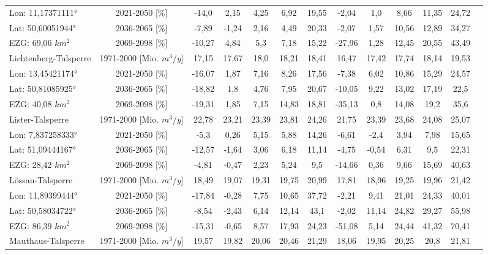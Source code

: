 \begin{longtable}{@{\extracolsep{\fill}}lc|ccccc||cccccc}
\cline{2-13} 
Lon: 11,17371111° & 2021-2050 [\%]  & -14,0 & 2,15 & 4,25 & 6,92 & 19,55 & -2,04 & 1,0 & 8,66 & 11,35 & 24,72 & \\ 
Lat: 50,60051944° & 2036-2065 [\%]  & -7,89 & -1,24 & 2,16 & 4,49 & 20,33 & -2,07 & 1,57 & 10,56 & 12,89 & 34,27 & \\ 
EZG: 69,06 $km^2$ & 2069-2098 [\%]  & -10,27 & 4,84 & 5,3 & 7,18 & 15,22 & -27,96 & 1,28 & 12,45 & 20,55 & 43,49 & \\ 
\hline 
Lichtenberg-Talsperre & 1971-2000 [Mio. $m^3/y$]  & 17,15 & 17,67 & 18,0 & 18,21 & 18,41 & 16,47 & 17,42 & 17,74 & 18,14 & 19,53 & \\ 
\cline{2-13} 
Lon: 13,45421174° & 2021-2050 [\%]  & -16,07 & 1,87 & 7,16 & 8,26 & 17,56 & -7,38 & 6,02 & 10,86 & 15,29 & 24,57 & \\ 
Lat: 50,81085925° & 2036-2065 [\%]  & -18,82 & 1,8 & 4,76 & 7,95 & 20,67 & -10,05 & 9,22 & 13,02 & 17,19 & 22,5 & \\ 
EZG: 40,08 $km^2$ & 2069-2098 [\%]  & -19,31 & 1,85 & 7,15 & 14,83 & 18,81 & -35,13 & 0,8 & 14,08 & 19,2 & 35,6 & \\ 
\hline 
Lister-Talsperre & 1971-2000 [Mio. $m^3/y$]  & 22,78 & 23,21 & 23,39 & 23,81 & 24,26 & 21,75 & 23,39 & 23,68 & 24,08 & 25,07 & \\ 
\cline{2-13} 
Lon: 7,837258333° & 2021-2050 [\%]  & -5,3 & 0,26 & 5,15 & 5,88 & 14,26 & -6,61 & -2,4 & 3,94 & 7,98 & 15,65 & \\ 
Lat: 51,09444167° & 2036-2065 [\%]  & -12,57 & -1,64 & 3,06 & 6,18 & 11,14 & -4,75 & -0,54 & 6,31 & 9,5 & 22,31 & \\ 
EZG: 28,42 $km^2$ & 2069-2098 [\%]  & -4,81 & -0,47 & 2,23 & 5,24 & 9,5 & -14,66 & 0,36 & 9,66 & 15,69 & 40,63 & \\ 
\hline 
Lössau-Talsperre & 1971-2000 [Mio. $m^3/y$]  & 18,49 & 19,07 & 19,31 & 19,75 & 20,99 & 17,81 & 18,96 & 19,25 & 19,96 & 21,42 & \\ 
\cline{2-13} 
Lon: 11,89399444° & 2021-2050 [\%]  & -17,84 & -0,28 & 7,75 & 10,65 & 37,72 & -2,21 & 9,41 & 21,01 & 24,33 & 40,01 & \\ 
Lat: 50,58034722° & 2036-2065 [\%]  & -8,54 & -2,43 & 6,14 & 12,14 & 43,1 & -2,02 & 11,14 & 24,82 & 29,27 & 55,98 & \\ 
EZG: 86,39 $km^2$ & 2069-2098 [\%]  & -15,31 & -0,65 & 8,57 & 17,93 & 24,23 & -51,08 & 5,14 & 24,44 & 41,32 & 70,41 & \\ 
\hline 
Mauthaus-Talsperre & 1971-2000 [Mio. $m^3/y$]  & 19,57 & 19,82 & 20,06 & 20,46 & 21,29 & 18,06 & 19,95 & 20,25 & 20,8 & 21,81 & \\ 

\end{longtable}
